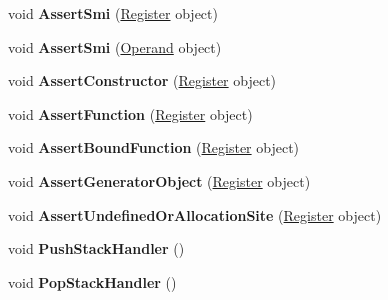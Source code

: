 \begin{DoxyCompactItemize}
void {\bfseries Assert\+Smi} (\mbox{\hyperlink{classv8_1_1internal_1_1Register}{Register}} object)
\item 
\mbox{\label{classv8_1_1internal_1_1MacroAssembler_adc71b6ec42bef6f534511707770528e3}} 
void {\bfseries Assert\+Smi} (\mbox{\hyperlink{classv8_1_1internal_1_1Operand}{Operand}} object)
\item 
\mbox{\label{classv8_1_1internal_1_1MacroAssembler_a6a0f31c1173192d0ff1e325d711e099f}} 
void {\bfseries Assert\+Constructor} (\mbox{\hyperlink{classv8_1_1internal_1_1Register}{Register}} object)
\item 
\mbox{\label{classv8_1_1internal_1_1MacroAssembler_aa8d13935f0543f10e23d7b44595f48bb}} 
void {\bfseries Assert\+Function} (\mbox{\hyperlink{classv8_1_1internal_1_1Register}{Register}} object)
\item 
\mbox{\label{classv8_1_1internal_1_1MacroAssembler_acbd0894b4e268684a580f99882497aed}} 
void {\bfseries Assert\+Bound\+Function} (\mbox{\hyperlink{classv8_1_1internal_1_1Register}{Register}} object)
\item 
\mbox{\label{classv8_1_1internal_1_1MacroAssembler_aa71ed557199e69728a422efb18e8fc65}} 
void {\bfseries Assert\+Generator\+Object} (\mbox{\hyperlink{classv8_1_1internal_1_1Register}{Register}} object)
\item 
\mbox{\label{classv8_1_1internal_1_1MacroAssembler_ad484d7f3e437093d3d9ab4b82959544b}} 
void {\bfseries Assert\+Undefined\+Or\+Allocation\+Site} (\mbox{\hyperlink{classv8_1_1internal_1_1Register}{Register}} object)
\item 
\mbox{\label{classv8_1_1internal_1_1MacroAssembler_af8ec8c2c3c525fa27b47125b8f2c90fb}} 
void {\bfseries Push\+Stack\+Handler} ()
\item 
\mbox{\label{classv8_1_1internal_1_1MacroAssembler_aaec1b780d52416c78d49b94483afa4f8}} 
void {\bfseries Pop\+Stack\+Handler} ()
\item 

\end{DoxyCompactItemize}
